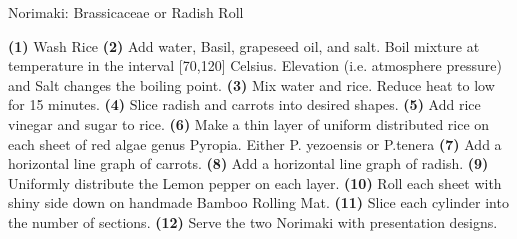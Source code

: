 \documentclass{recipecard}
\begin{document}
\vspace{8pt}
\begin{recipe}{Norimaki: Brassicaceae or Radish Roll}{}

 \textbf{(1)} Wash Rice 
 \textbf{(2)} Add water, Basil, grapeseed oil, and salt. Boil mixture at temperature in the interval [70,120] Celsius. Elevation (i.e. atmosphere pressure) and Salt changes the boiling point. 
 \textbf{(3)} Mix water and rice. Reduce heat to low for 15 minutes. 
 \textbf{(4)} Slice radish and carrots into desired shapes. 
 \textbf{(5)} Add rice vinegar and sugar to rice. 
 \textbf{(6)} Make a thin layer of uniform distributed rice on each sheet of red algae genus Pyropia. Either P. yezoensis or P.tenera 
 \textbf{(7)} Add a horizontal line graph of carrots. 
 \textbf{(8)} Add a horizontal line graph of radish. 
 \textbf{(9)} Uniformly distribute the Lemon pepper on each layer.
 \textbf{(10)} Roll each sheet with shiny side down on handmade Bamboo Rolling Mat. 
 \textbf{(11)} Slice each cylinder into the number of sections.
 \textbf{(12)} Serve the two Norimaki with presentation designs.
\end{recipe}
\end{document}
